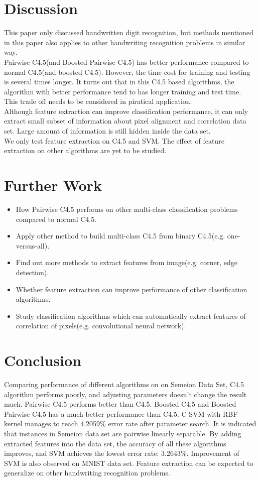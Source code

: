 \documentclass[a4paper,11pt]{article}
\begin{document}
\section{Discussion}
This paper only discussed handwritten digit recognition, but methods mentioned in this paper also applies to other handwriting recognition problems in similar way.\\
Pairwise C4.5(and Boosted Pairwise C4.5) has better performance compared to normal C4.5(and boosted C4.5). However, the time cost for training and testing is several times longer. It turns out that in this C4.5 based algorithms, the algorithm with better performance tend to has longer training and test time. This trade off needs to be considered in piratical application.\\
Although feature extraction can improve classification performance, it can only extract small subset of information about pixel alignment and correlation data set. Large amount of information is still hidden inside the data set.\\
We only test feature extraction on C4.5 and SVM. The effect of feature extraction on other algorithms are yet to be studied.\\

\section{Further Work}
\begin{itemize}
 \item How Pairwise C4.5 performs on other multi-class classification problems compared to normal C4.5.
 \item Apply other method to build multi-class C4.5 from binary C4.5(e.g. one-versus-all).
 \item Find out more methods to extract features from image(e.g. corner, edge detection).
 \item Whether feature extraction can improve performance of other classification algorithms.
 \item Study classification algorithms which can automatically extract features of correlation of pixels(e.g. convolutional neural network\cite{lecun98}).
\end{itemize}

\section{Conclusion}
Comparing performance of different algorithms on on Semeion Data Set, C4.5 algorithm performs poorly, and adjusting parameters doesn't change the result much. Pairwise C4.5 performs better than C4.5. Boosted C4.5 and Boosted Pairwise C4.5 has a much better performance than C4.5. C-SVM with RBF kernel manages to reach 4.2059\% error rate after parameter search. It is indicated that instances in Semeion data set are pairwise linearly separable. By adding extracted features into the data set, the accuracy of all these algorithms improves, and SVM achieves the lowest error rate: 3.2643\%. Improvement of SVM is also observed on MNIST data set. Feature extraction can be expected to generalize on other handwriting recognition problems.

\newpage


\end{document}
